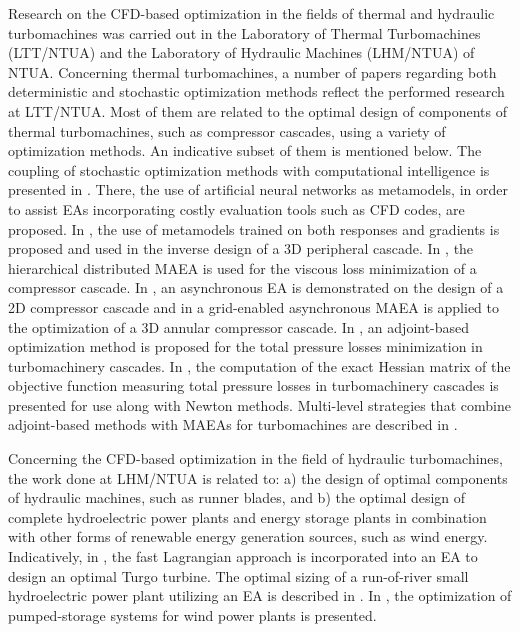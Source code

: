 Research on the CFD-based optimization in the fields of thermal and hydraulic turbomachines was carried out in the Laboratory of Thermal Turbomachines (LTT/NTUA) and the Laboratory of Hydraulic Machines (LHM/NTUA) of NTUA. 
Concerning thermal turbomachines, a number of papers regarding both deterministic and stochastic optimization methods reflect the performed research at LTT/NTUA. Most of them are related to the optimal design of components of thermal turbomachines, such as compressor cascades, using a variety of optimization methods.  An indicative subset of them is mentioned below. The coupling of stochastic optimization methods with computational intelligence is presented in \cite{LTT_2_018,LTT_2_020,LTT_2_023}. There, the use of artificial neural networks as metamodels, in order to assist  EAs incorporating costly evaluation tools such as CFD codes, are proposed. In \cite{LTT_2_026}, the use of metamodels trained  on both responses and gradients is proposed and used in the inverse design of a 3D peripheral cascade. In \cite{LTT_2_031}, the hierarchical distributed MAEA is used for the viscous loss minimization of a compressor cascade. In \cite{LTT_2_040}, an asynchronous EA is demonstrated on the  design of a 2D compressor cascade and in \cite{LTT_2_045} a grid-enabled asynchronous MAEA is applied to the optimization of a 3D annular compressor cascade. In \cite{LTT_2_032}, an adjoint-based optimization method is proposed for the total pressure losses minimization in turbomachinery cascades.  In \cite{LTT_2_049},  the computation of the exact Hessian matrix of the objective function measuring total pressure losses in turbomachinery cascades is presented for use along with Newton methods. Multi-level strategies that combine adjoint-based methods with MAEAs for turbomachines are described in \cite{LTT_3_092}.


Concerning the CFD-based optimization in the field of hydraulic turbomachines, the work done at LHM/NTUA is related to: a) the design of optimal components of hydraulic machines, such as runner blades, and b) the optimal design of complete hydroelectric power plants and energy storage plants in combination with other forms of renewable energy generation sources, such as wind energy. Indicatively, in \cite{Anagno4}, the fast Lagrangian approach is incorporated into an EA to design an optimal Turgo turbine. The optimal sizing of a run-of-river small hydroelectric power plant utilizing an EA is described in \cite{Anagno3}. In \cite{Anagno5,Anagno6}, the optimization of pumped-storage systems for wind power plants is presented.

